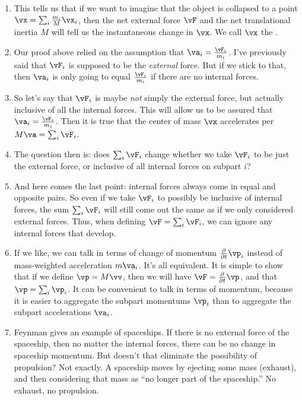 \begin{enumerate}
  \item This tells us that if we want to imagine that the object is
  collapsed to a point $\vx = \sum_i \frac{m_i}{M} \vx_i$, then the net
  external force $\vF$ and the net translational inertia $M$ will tell
  us the instantaneous change in $\vx$. We call $\vx$ the .

  \item Our proof above relied on the assumption that $\va_i =
  \frac{\vF_i}{m_i}$. I've previously said that $\vF_i$ is supposed to
  be the \emph{external} force. But if we stick to that, then $\va_i$ is
  only going to equal $\frac{\vF_i}{m_i}$ if there are no internal
  forces.

  \item So let's say that $\vF_i$ is maybe \emph{not} simply the
  external force, but actually inclusive of all the internal forces.
  This will allow us to be assured that $\va_i = \frac{\vF_i}{m_i}$.
  Then it is true that the center of mass $\vx$ accelerates per $M \va =
  \sum_i \vF_i$.

  \item The question then is: does $\sum_i \vF_i$ change whether we take
  $\vF_i$ to be just the external force, or inclusive of all internal
  forces on subpart $i$?

  \item And here comes the last point: internal forces always come in
  equal and opposite pairs. So even if we take $\vF_i$ to possibly be
  inclusive of internal forces, the sum $\sum_i \vF_i$ will still come
  out the same as if we only considered external forces. Thus, when
  defining $\vF = \sum_i \vF_i$, we can ignore any internal forces that
  develop.

  \item If we like, we can talk in terms of change of momentum
  $\fpartial{t} \vp_i$ instead of mass-weighted acceleration $m \va_i$.
  It's all equivalent. It is simple to show that if we define $\vp = M
  \vv$, then we will have $\vF = \fpartial{t} \vp$, and that $\vp =
  \sum_i \vp_i$. It can be convenient to talk in terms of momentum,
  because it is easier to aggregate the subpart momentums $\vp_i$ than
  to aggregate the subpart accelerations $\va_i$.

  \item Feynman gives an example of spaceships. If there is no external
  force of the spaceship, then no matter the internal forces, there can
  be no change in spaceship momentum. But doesn't that eliminate the
  possibility of propulsion? Not exactly. A spaceship moves by ejecting
  some mass (exhaust), and then considering that mass as ``no longer
  part of the spaceship.'' No exhaust, no propulsion.
\end{enumerate}
